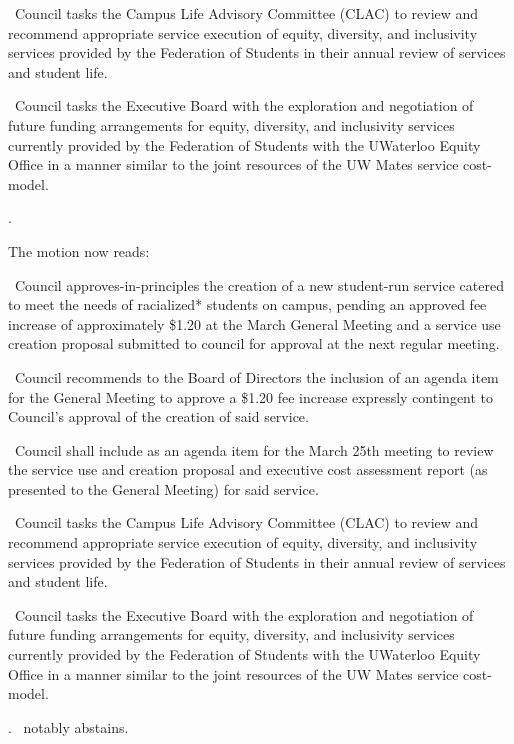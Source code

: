 \begin{motion}
\begin{motion}
\begin{motion}
            \bifrt\ Council tasks the Campus Life Advisory Committee (CLAC) to
            review and recommend appropriate service execution of equity,
            diversity, and inclusivity services provided by the Federation of
            Students in their annual review of services and student life.

            \bifrt\ Council tasks the Executive Board with the exploration and
            negotiation of future funding arrangements for equity, diversity,
            and inclusivity services currently provided by the Federation of
            Students with the UWaterloo Equity Office in a manner similar to
            the joint resources of the UW Mates service cost-model.
        \end{motion}

        \carries.
    \end{motion}

    The motion now reads: 
    \begin{motion} 
        \birt\ Council approves-in-principles the creation of a
        new student-run service catered to meet the needs of racialized*
        students on campus, pending an approved fee increase of
        approximately \$1.20 at the March General Meeting and a service use
        creation proposal submitted to council for approval at the next
        regular meeting.

        \bifrt\ Council recommends to the Board of Directors the inclusion
        of an agenda item for the General Meeting to approve a \$1.20 fee
        increase expressly contingent to Council’s approval of the creation
        of said service.

        \bifrt\ Council shall include as an agenda item for the March 25th
        meeting to review the service use and creation proposal and
        executive cost assessment report (as presented to the General
        Meeting) for said service.

        \bifrt\ Council tasks the Campus Life Advisory Committee (CLAC) to
        review and recommend appropriate service execution of equity,
        diversity, and inclusivity services provided by the Federation of
        Students in their annual review of services and student life.

        \bifrt\ Council tasks the Executive Board with the exploration and
        negotiation of future funding arrangements for equity, diversity,
        and inclusivity services currently provided by the Federation of
        Students with the UWaterloo Equity Office in a manner similar to
        the joint resources of the UW Mates service cost-model.
    \end{motion}

    \carries. \jason\ notably abstains. 

\end{motion}

